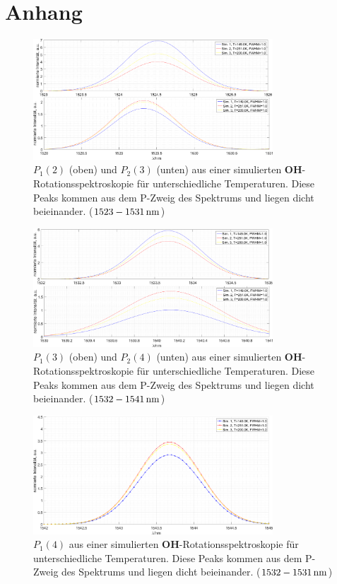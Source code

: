 \documentclass[numbers=noenddot,a4paper,notitlepage,twoside,BCOR15mm]{scrartcl}
\newcommand{\ix}[1]{_\text{#1}}
\newcommand{\fett}[1]{\textbf{#1}}
\begin{document}
	\clearpage
	\section{Anhang}\label{sec:anha}


					\begin{figure}[h]
						\centering
						\includegraphics[width=0.8\textwidth]{p1up2_sim_spektr.png}
						\caption{$P\ix{1}(2)$ (oben) und $P\ix{2}(3)$ (unten) aus einer simulierten \fett{OH}-Rotationsspektroskopie für unterschiedliche Temperaturen. Diese Peaks kommen aus dem P-Zweig des Spektrums und liegen dicht beieinander. ($\unit[1523-1531]{nm}$)}
						\label{img:p1up2}
					\end{figure}
					\begin{figure}[h]
						\centering
						\includegraphics[width=0.8\textwidth]{p3up4_sim_spektr.png}
						\caption{$P\ix{1}(3)$ (oben) und $P\ix{2}(4)$ (unten) aus einer simulierten \fett{OH}-Rotationsspektroskopie für unterschiedliche Temperaturen. Diese Peaks kommen aus dem P-Zweig des Spektrums und liegen dicht beieinander. ($\unit[1532-1541]{nm}$)}
						\label{img:p3up4}
					\end{figure}
					\begin{figure}[h]
						\centering
						\includegraphics[width=0.8\textwidth]{p5_sim_spektr.png}
						\caption{$P\ix{1}(4)$ aus einer simulierten \fett{OH}-Rotationsspektroskopie für unterschiedliche Temperaturen. Diese Peaks kommen aus dem P-Zweig des Spektrums und liegen dicht beieinander. ($\unit[1532-1531]{nm}$)}
						\label{img:p5}
					\end{figure}


	\clearpage

		
		
\end{document}
